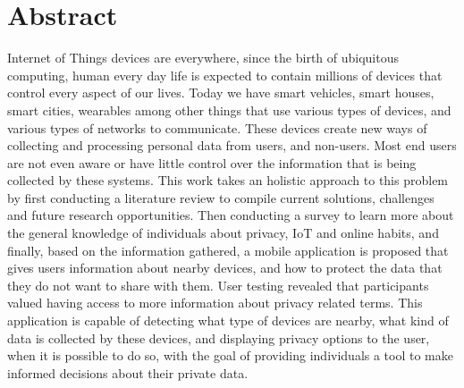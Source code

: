 %
%
\chapter*{Abstract}
\justify

Internet of Things devices are everywhere, since the birth of ubiquitous
computing, human every day life is expected to contain millions of
devices that control every aspect of our lives. Today we have smart vehicles,
smart houses, smart cities, wearables among other things that use various
types of devices, and various types of networks to communicate. These devices
create new ways of collecting and processing personal data from users, and
non-users. Most end users are not even aware or have little control over
the information that is being collected by these systems. This work takes
an holistic approach to this problem by first conducting a literature review
to compile current solutions, challenges and future research opportunities.
Then conducting a survey to learn more about the general knowledge of
individuals about privacy, IoT and online habits, and finally, based on the
information gathered, a mobile application is proposed that gives users
information about nearby devices, and how
to protect the data that they do not want to share with them.
User testing revealed that participants valued having access to more
information about privacy related terms. This
application is capable of detecting what type of devices are nearby, what kind
of data is collected by these devices, and displaying privacy options to the user,
when it is possible to do so, with the goal of providing individuals a tool to make
informed decisions about their private data.

